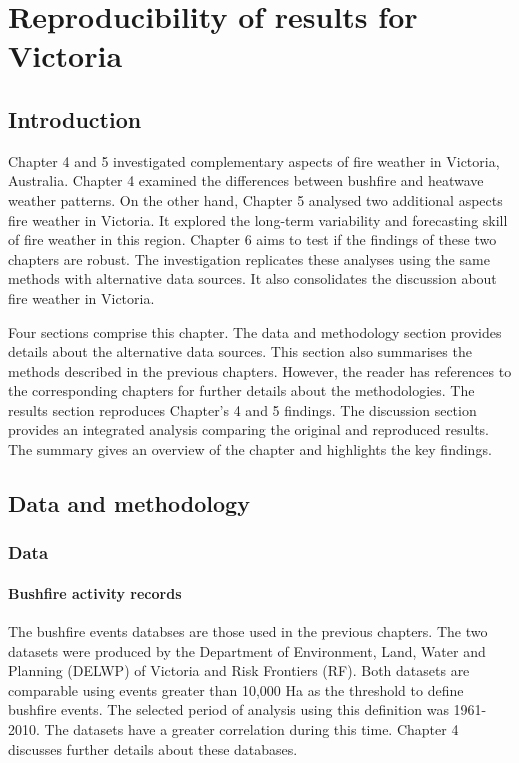 
\chapter{Reproducibility of results for Victoria}
\newpage{}


\section{Introduction}

Chapter 4 and 5 investigated complementary aspects of fire weather
in Victoria, Australia. Chapter 4 examined the differences between
bushfire and heatwave weather patterns. On the other hand, Chapter
5 analysed two additional aspects fire weather in Victoria. It explored
the long-term variability and forecasting skill of fire weather in
this region. Chapter 6 aims to test if the findings of these two chapters
are robust. The investigation replicates these analyses using the
same methods with alternative data sources. It also consolidates the
discussion about fire weather in Victoria.

Four sections comprise this chapter. The data and methodology section
provides details about the alternative data sources. This section
also summarises the methods described in the previous chapters. However,
the reader has references to the corresponding chapters for further
details about the methodologies. The results section reproduces Chapter's
4 and 5 findings. The discussion section provides an integrated analysis
comparing the original and reproduced results. The summary gives an
overview of the chapter and highlights the key findings.


\section{Data and methodology}


\subsection{Data}


\subsubsection{Bushfire activity records}

The bushfire events databses are those used in the previous chapters.
The two datasets were produced by the Department of Environment, Land,
Water and Planning (DELWP) of Victoria and Risk Frontiers (RF). Both
datasets are comparable using events greater than 10,000 Ha as the
threshold to define bushfire events. The selected period of analysis
using this definition was 1961-2010. The datasets have a greater correlation
during this time. Chapter 4 discusses further details about these
databases.


